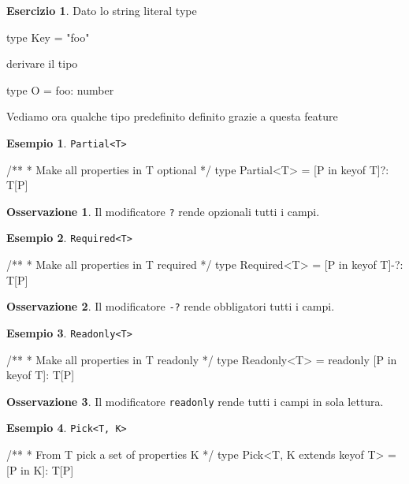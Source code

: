 \documentclass[12pt]{article}
\theoremstyle{definition}
\newtheorem{example}{Esempio}[subsection]
\newtheorem{exercise}{Esercizio}[subsection]
\newtheorem{observation}{Osservazione}[subsection]
\newenvironment{code}
  {\vspace{0.5cm} \VerbatimEnvironment\begin{typescriptcode}}
  {\end{typescriptcode} \vspace{0.2cm}}
\begin{document}
\begin{exercise}
Dato lo string literal type

\begin{code}
type Key = "foo"
\end{code}

derivare il tipo

\begin{code}
type O = {
  foo: number
}
\end{code}
\end{exercise}

Vediamo ora qualche tipo predefinito definito grazie a questa feature

\begin{example}
\texttt{Partial<T>}

\begin{code}
/**
 * Make all properties in T optional
 */
type Partial<T> = { [P in keyof T]?: T[P] }
\end{code}
\end{example}

\begin{observation}
Il modificatore \texttt{?} rende opzionali tutti i campi.
\end{observation}

\begin{example}
\texttt{Required<T>}

\begin{code}
/**
 * Make all properties in T required
 */
type Required<T> = { [P in keyof T]-?: T[P] }
\end{code}
\end{example}

\begin{observation}
Il modificatore \texttt{-?} rende obbligatori tutti i campi.
\end{observation}

\begin{example}
\texttt{Readonly<T>}

\begin{code}
/**
* Make all properties in T readonly
*/
type Readonly<T> = { readonly [P in keyof T]: T[P] }
\end{code}
\end{example}

\begin{observation}
Il modificatore \texttt{readonly} rende tutti i campi in sola lettura.
\end{observation}

\begin{example}
\texttt{Pick<T, K>}

\begin{code}
/**
* From T pick a set of properties K
*/
type Pick<T, K extends keyof T> = { [P in K]: T[P] }
\end{code}
\end{example}
\end{document}
